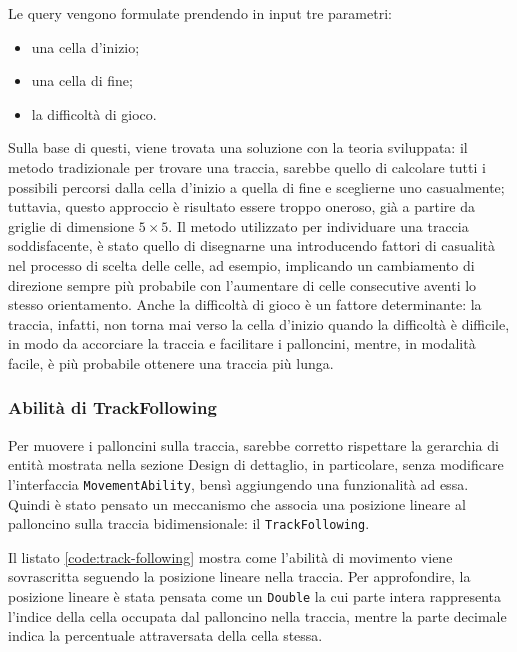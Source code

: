 

Le query vengono formulate prendendo in input tre parametri:
\begin{itemize}
    \item una cella d'inizio;
    \item una cella di fine;
    \item la difficoltà di gioco.
\end{itemize}

Sulla base di questi, viene trovata una soluzione con la teoria sviluppata: il metodo tradizionale per trovare una
traccia, sarebbe quello di calcolare tutti i possibili percorsi dalla cella d'inizio a quella di fine e sceglierne uno
casualmente; tuttavia, questo approccio è risultato essere troppo oneroso, già a partire da griglie di dimensione
$5 \times 5$. Il metodo utilizzato per individuare una traccia soddisfacente, è stato quello di disegnarne una
introducendo fattori di casualità nel processo di scelta delle celle, ad esempio, implicando un cambiamento di direzione
sempre più probabile con l'aumentare di celle consecutive aventi lo stesso orientamento. Anche la difficoltà di gioco
è un fattore determinante: la traccia, infatti, non torna mai verso la cella d'inizio quando la difficoltà è difficile,
in modo da accorciare la traccia e facilitare i palloncini, mentre, in modalità facile, è più probabile ottenere una
traccia più lunga.

\subsubsection{Abilità di TrackFollowing}
Per muovere i palloncini sulla traccia, sarebbe corretto rispettare la gerarchia di entità mostrata nella sezione
Design di dettaglio, in particolare, senza modificare l'interfaccia \texttt{MovementAbility}, bensì aggiungendo una
funzionalità ad essa. Quindi è stato pensato un meccanismo che associa una posizione lineare al palloncino sulla
traccia bidimensionale: il \texttt{TrackFollowing}.



Il listato \ref{code:track-following} mostra come l'abilità di movimento viene sovrascritta seguendo la posizione
lineare nella traccia. Per approfondire, la posizione lineare è stata pensata come un \texttt{Double} la cui parte
intera rappresenta l'indice della cella occupata dal palloncino nella traccia, mentre la parte decimale indica la
percentuale attraversata della cella stessa.

